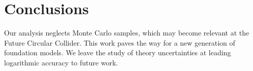 \section{Conclusions}\label{sec:conclusions}

Our analysis neglects Monte Carlo samples, which may become relevant at
the Future Circular Collider. This work paves the way for a new
generation of foundation models. We leave the study of theory
uncertainties at leading logarithmic accuracy to future work.

